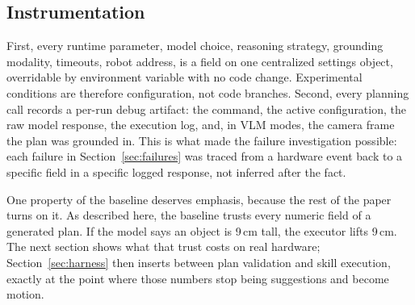 \subsection{Instrumentation}
\label{sec:baseline-instrumentation}

 First, every runtime parameter, model choice, reasoning
strategy, grounding modality, timeouts, robot address, is a field on
one centralized settings object, overridable by environment variable
with no code change. Experimental conditions are therefore
configuration, not code branches. Second, every planning call records a
per-run debug artifact: the command, the active configuration, the raw
model response, the execution log, and, in VLM modes, the camera frame
the plan was grounded in. This is what made the failure investigation
possible: each failure in Section~\ref{sec:failures} was traced from a
hardware event back to a specific field in a specific logged response,
not inferred after the fact.

One property of the baseline deserves emphasis, because the rest
of the paper turns on it. As described here, the baseline trusts every
numeric field of a generated plan. If the model says an object is
9\,cm tall, the executor lifts 9\,cm. The next section shows what that
trust costs on real hardware; Section~\ref{sec:harness} then inserts
\harness{} between plan validation and skill execution, exactly at the
point where those numbers stop being suggestions and become motion.
